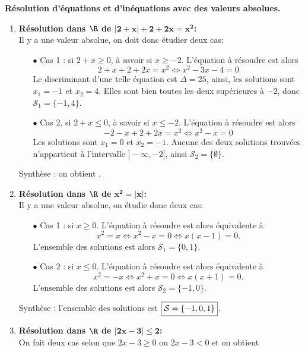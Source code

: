 
\begin{correction}  \; \textbf{R\'esolution d'\'equations et d'in\'equations avec des valeurs absolues.}\\
\begin{enumerate}
\item \textbf{R\'esolution dans $\mathbf{\R}$ de $\mathbf{|2+x|+2+2x=x^2}$:}\\
\noindent Il y a une valeur absolue, on doit donc \'etudier deux cas:
\begin{itemize}
 \item[$\bullet$] Cas 1 : si $2+x\geq 0$, \`a savoir si $x\geq -2$. L'\'equation \`a r\'esoudre est alors
$$2+x+2+2x=x^2\Leftrightarrow x^2-3x-4=0$$
Le discriminant d'une telle \'equation est $\Delta=25$, ainsi, les solutions sont $x_1=-1$ et $x_2=4$. Elles sont bien toutes les deux sup\'erieures \`a $-2$, donc $\mathcal{S}_1=\lbrace -1,4 \rbrace$.
\item[$\bullet$] Cas 2, si $2+x\leq 0$, \`a savoir si $x\leq -2$. L'\'equation \`a r\'esoudre est alors
$$-2-x+2+2x=x^2\Leftrightarrow x^2-x=0$$
Les solutions sont $x_1=0$ et $x_2=-1$. Aucune des deux solutions trouv\'ees n'appartient  \`a l'intervalle $\rbrack -\infty,-2\rbrack$, ainsi $\mathcal{S}_2=\lbrace  \emptyset\rbrace$.
\end{itemize}
Synth\`ese : on obtient . 
\item \textbf{R\'esolution dans $\mathbf{\R}$ de $\mathbf{x^2=|x|}$:}\\
\noindent Il y a une valeur absolue, on \'etudie donc deux cas:
\begin{itemize}
 \item[$\bullet$] Cas 1 : si $x\geq 0$. L'\'equation \`a r\'esoudre est alors \'equivalente \`a
$$x^2=x\Leftrightarrow x^2-x=0\Leftrightarrow x(x-1)=0.$$
L'ensemble des solutions est alors $\mathcal{S}_1=\lbrace 0,1 \rbrace$.
\item[$\bullet$] Cas 2 : si $x\leq 0$. L'\'equation \`a r\'esoudre est alors \'equivalente \`a
$$x^2=-x\Leftrightarrow x^2+x=0\Leftrightarrow x(x+1)=0.$$
L'ensemble des solutions est alors $\mathcal{S}_2=\lbrace -1,0 \rbrace$.
\end{itemize}
Synth\`ese : l'ensemble des solutions est $\fbox{$  \mathcal{S}=\lbrace -1,0,1 \rbrace $}$.
\item \textbf{R\'esolution dans $\mathbf{\R}$ de $\mathbf{|2x-3|\leq 2}$:}\\
\noindent On fait deux cas selon que $2x-3\geq 0$ ou $2x-3<0$ et on obtient 

\end{enumerate}
\end{correction}

